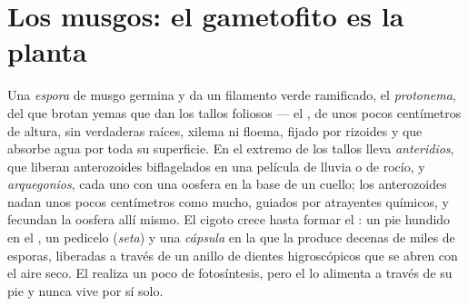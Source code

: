 \section{Los musgos: el gametofito es la planta}

\begin{definition}\label{def:b2:plant-life-cycles:moss}
Una \emph{espora} de musgo germina y da un filamento verde ramificado, el
\emph{protonema}, del que brotan yemas que dan los tallos foliosos --- el
\emph{}, de unos pocos centímetros de altura, sin verdaderas
raíces, xilema ni floema, fijado por rizoides y que absorbe agua por toda
su superficie. En el extremo de los tallos lleva \emph{anteridios}, que
liberan anterozoides biflagelados en una película de lluvia o de
rocío, y \emph{arquegonios}, cada uno con una oosfera en la base de un
cuello; los anterozoides nadan unos pocos centímetros como mucho,
guiados por atrayentes químicos, y fecundan la oosfera allí mismo. El
cigoto crece hasta formar el \emph{}: un pie hundido en el
, un pedicelo (\emph{seta}) y una \emph{cápsula} en la que la
 produce decenas de miles de esporas, liberadas a través de un
anillo de dientes higroscópicos que se abren con el aire seco. El
 realiza un poco de fotosíntesis, pero el  lo
alimenta a través de su pie y nunca vive por sí solo.
\end{definition}

